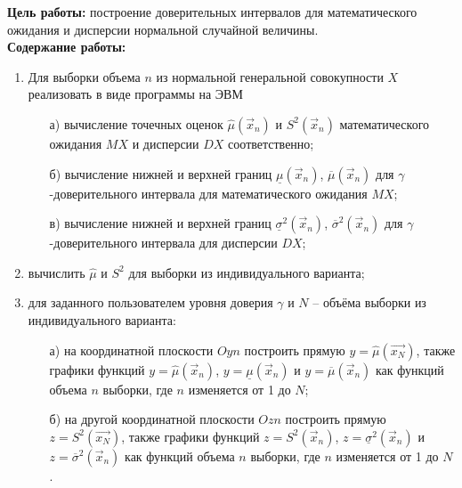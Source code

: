\textbf{Цель работы:} построение доверительных интервалов для математического ожидания и дисперсии нормальной случайной величины. \\

\qquad\textbf{Содержание работы:}

\begin{enumerate}
	\item Для выборки объема $n$ из нормальной генеральной совокупности $X$ реализовать в виде программы на ЭВМ
	\begin{itemize}
		\item[а)] вычисление точечных оценок $\hat\mu(\vec x_n)$ и $S^2(\vec x_n)$ математического ожидания $MX$ и дисперсии $DX$ соответственно;
		\item[б)] вычисление нижней и верхней границ $\underline\mu(\vec x_n)$, $\overline\mu(\vec x_n)$ для $\gamma$-доверительного интервала для математического ожидания $MX$;
		\item[в)] вычисление нижней и верхней границ $\underline\sigma^2(\vec x_n)$, $\overline\sigma^2(\vec x_n)$ для $\gamma$-доверительного интервала для дисперсии $DX$;
	\end{itemize}
	\item вычислить $\hat\mu$ и $S^2$ для выборки из индивидуального варианта;
	\item для заданного пользователем уровня доверия $\gamma$ и $N$ – объёма выборки из индивидуального варианта:
	\begin{itemize}
		\item[а)] на координатной плоскости $Oyn$ построить прямую $y = \hat\mu(\vec{x_N})$, также графики функций $y = \hat\mu(\vec x_n)$, $y = \underline\mu(\vec x_n)$ и $y = \overline\mu(\vec x_n)$ как функций объема $n$ выборки, где $n$ изменяется от 1 до $N$;
		\item[б)] на другой координатной плоскости $Ozn$ построить прямую $z = S^2(\vec{x_N})$, также графики функций $z = S^2(\vec x_n)$, $z = \underline\sigma^2(\vec x_n)$ и $z = \overline\sigma^2(\vec x_n)$ как функций объема $n$ выборки, где $n$ изменяется от 1 до $N$.
	\end{itemize}
\end{enumerate}
